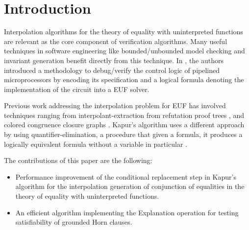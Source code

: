 \documentclass[10pt, sigconf,authordraft]{acmart}
\begin{document}


\maketitle

\section{Introduction}

Interpolation algorithms for the theory of equality with uninterpreted functions are relevant
as the core component of verification algorithms. Many useful techniques in software
engineering like bounded/unbounded model checking and invariant generation benefit directly from
this technique. In \cite{10.1007/3-540-58179-0_44}, the authors introduced a methodology to
debug/verify the control logic of pipelined microprocessors by encoding its specification and
a logical formula denoting the implementation of the circuit into a EUF solver.

Previous work addressing the interpolation problem for EUF has involved techniques ranging from
interpolant-extraction from refutation proof trees \cite{10.1007/978-3-540-24730-2_2,
  mcmillan2011interpolants, 10.1007/978-3-642-31612-8_24}, and colored congruence closure
graphs \cite{10.1007/978-3-642-00768-2_34}. Kapur's algorithm uses a different approach by using
quantifier-elimination, a procedure that given a formula, it produces a logically equivalent formula
 without a variable in particular \cite{DBLP:books/daglib/0076838}.

The contributions of this paper are the following:
\begin{itemize}
\item Performance improvement of the conditional replacement step in Kapur's algorithm
  for the interpolation generation of conjunction of equalities in
  the theory of equality with uninterpreted functions.
\item An efficient algorithm implementing the Explanation operation
  for testing satisfiability of grounded Horn clauses.
\end{itemize}
\end{document}
